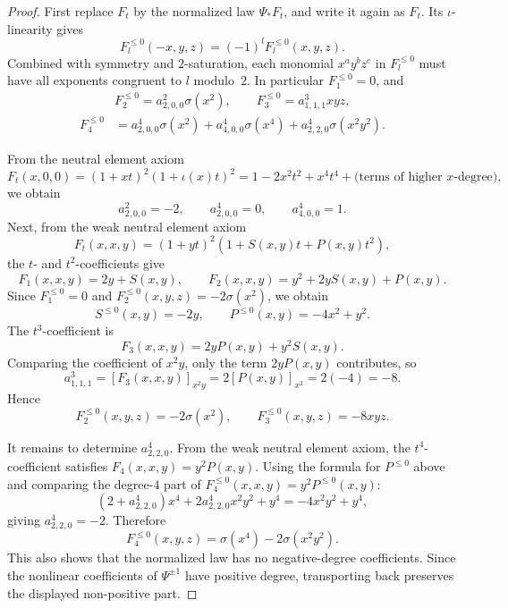 \documentclass[10pt,a4paper]{amsart}
\renewcommand{\le}{\leqslant}
\begin{document}
\begin{proof}
	First replace $F_t$ by the normalized law $\Psi_*F_t$, and write it again as $F_t$. Its $\iota$-linearity gives
	\[
		F_l^{\le 0}(-x,y,z)=(-1)^l F_l^{\le 0}(x,y,z).
	\]
	Combined with symmetry and $2$-saturation, each monomial $x^ay^bz^c$ in $F_l^{\le 0}$ must have all exponents congruent to $l$ modulo~$2$. In particular $F_1^{\le 0}=0$, and
	\[
		\begin{aligned}
			            & F_2^{\le 0}=a^2_{2,0,0}\sigma(x^2),\qquad
			F_3^{\le 0}=a^3_{1,1,1}xyz,                                                             \\
			F_4^{\le 0} & =a^4_{2,0,0}\sigma(x^2)+a^4_{4,0,0}\sigma(x^4)+a^4_{2,2,0}\sigma(x^2y^2).
		\end{aligned}
	\]

	From the neutral element axiom
	\[
		F_t(x,0,0)=(1+xt)^2(1+\iota(x)t)^2
		=1-2x^2t^2+x^4t^4+\text{(terms of higher $x$-degree)},
	\]
	we obtain
	\[
		a^2_{2,0,0}=-2,\qquad
		a^4_{2,0,0}=0,\qquad
		a^4_{4,0,0}=1.
	\]
	Next, from the weak neutral element axiom
	\[
		F_t(x,x,y)=(1+yt)^2(1+S(x,y)t+P(x,y)t^2),
	\]
	the $t$- and $t^2$-coefficients give
	\[
		F_1(x,x,y)=2y+S(x,y),\qquad
		F_2(x,x,y)=y^2+2yS(x,y)+P(x,y).
	\]
	Since $F_1^{\le 0}=0$ and $F_2^{\le 0}(x,y,z)=-2\sigma(x^2)$, we obtain
	\[
		S^{\le 0}(x,y)=-2y,\qquad
		P^{\le 0}(x,y)=-4x^2+y^2.
	\]
	The $t^3$-coefficient is
	\[
		F_3(x,x,y)=2yP(x,y)+y^2S(x,y).
	\]
	Comparing the coefficient of $x^2y$, only the term $2yP(x,y)$ contributes, so
	\[
		a^3_{1,1,1}=[F_3(x,x,y)]_{x^2y}=2[P(x,y)]_{x^2}=2(-4)=-8.
	\]
	Hence
	\[
		F_2^{\le 0}(x,y,z)=-2\sigma(x^2),\qquad
		F_3^{\le 0}(x,y,z)=-8xyz.
	\]

	It remains to determine $a^4_{2,2,0}$. From the weak neutral element axiom, the $t^4$-coefficient satisfies $F_4(x,x,y)=y^2P(x,y)$. Using the formula for $P^{\le 0}$ above and comparing the degree-$4$ part of $F_4^{\le 0}(x,x,y)=y^2P^{\le 0}(x,y)$:
	\[
		(2+a^4_{2,2,0})x^4+2a^4_{2,2,0}x^2y^2+y^4=-4x^2y^2+y^4,
	\]
	giving $a^4_{2,2,0}=-2$. Therefore
	\[
		F_4^{\le 0}(x,y,z)=\sigma(x^4)-2\sigma(x^2y^2).
	\]
	This also shows that the normalized law has no negative-degree coefficients. Since the nonlinear coefficients of $\Psi^{\pm1}$ have positive degree, transporting back preserves the displayed non-positive part.
\end{proof}
\end{document}
